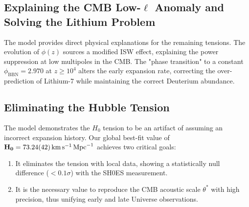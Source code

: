 \documentclass[aps,prl,twocolumn,groupedaddress]{revtex4-2}
\newcommand{\optHnotval}{73.24}
\newcommand{\optHnoterr}{0.42}
\newcommand{\optHnot}{\SI{\optHnotval \pm \optHnoterr}{km.s^{-1}.Mpc^{-1}}}
\newcommand{\optPhiBBN}{2.970}       %
\begin{document}
\subsection{Explaining the CMB Low-$\ell$ Anomaly and Solving the Lithium Problem}
The model provides direct physical explanations for the remaining tensions. The evolution of $\phi(z)$ sources a modified ISW effect, explaining the power suppression at low multipoles in the CMB. The "phase transition" to a constant $\phi_{\text{BBN}}=\optPhiBBN$ at $z \geq 10^4$ alters the early expansion rate, correcting the over-prediction of Lithium-7 while maintaining the correct Deuterium abundance.

\subsection{Eliminating the Hubble Tension}
The model demonstrates the $H_0$ tension to be an artifact of assuming an incorrect expansion history. 
Our global best-fit value of $\mathbf{H_0 = \optHnot}$ achieves two critical goals:
\begin{enumerate}
    \item It eliminates the tension with local data, showing a statistically null difference ($<0.1\sigma$) with the SH0ES measurement.
    \item It is the necessary value to reproduce the CMB acoustic scale $\theta^*$ with high precision, thus unifying early and late Universe observations.
\end{enumerate}
\end{document}
